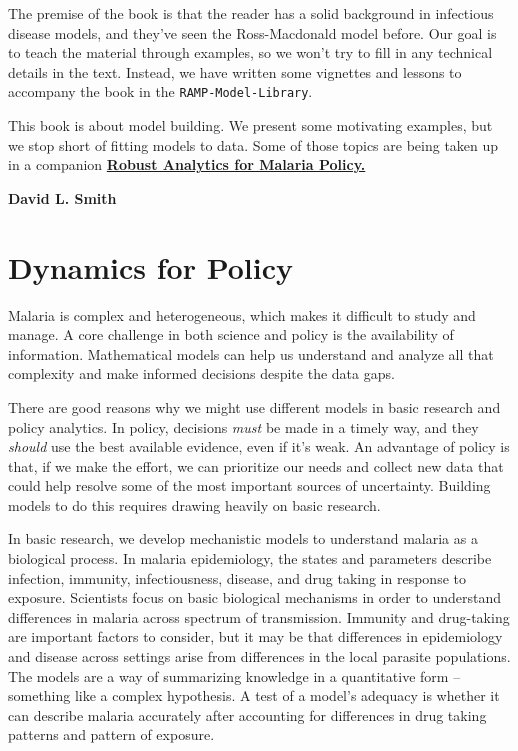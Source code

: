 \documentclass[
]{book}
\begin{document}
The premise of the book is that the reader has a solid background in infectious disease models, and they've seen the Ross-Macdonald model before. Our goal is to teach the material through examples, so we won't try to fill in any technical details in the text. Instead, we have written some vignettes and lessons to accompany the book in the \texttt{RAMP-Model-Library}.

This book is about model building. We present some motivating examples, but we stop short of fitting models to data. Some of those topics are being taken up in a companion \href{../../RAMP-Book/_book/index.html}{\textbf{Robust Analytics for Malaria Policy.}}

\textbf{David L. Smith}

\hypertarget{dynamics-for-policy}{%
\section*{Dynamics for Policy}\label{dynamics-for-policy}}

Malaria is complex and heterogeneous, which makes it difficult to study and manage. A core challenge in both science and policy is the availability of information. Mathematical models can help us understand and analyze all that complexity and make informed decisions despite the data gaps.

There are good reasons why we might use different models in basic research and policy analytics. In policy, decisions \emph{must} be made in a timely way, and they \emph{should} use the best available evidence, even if it's weak. An advantage of policy is that, if we make the effort, we can prioritize our needs and collect new data that could help resolve some of the most important sources of uncertainty. Building models to do this requires drawing heavily on basic research.

In basic research, we develop mechanistic models to understand malaria as a biological process. In malaria epidemiology, the states and parameters describe infection, immunity, infectiousness, disease, and drug taking in response to exposure. Scientists focus on basic biological mechanisms in order to understand differences in malaria across spectrum of transmission. Immunity and drug-taking are important factors to consider, but it may be that differences in epidemiology and disease across settings arise from differences in the local parasite populations. The models are a way of summarizing knowledge in a quantitative form -- something like a complex hypothesis. A test of a model's adequacy is whether it can describe malaria accurately after accounting for differences in drug taking patterns and pattern of exposure.
\end{document}
